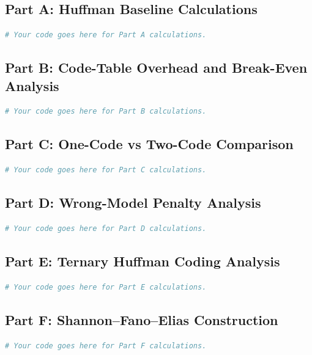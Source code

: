 \documentclass[11pt,a4paper]{article}
\begin{document}
\subsection{Part A: Huffman Baseline Calculations}
\begin{lstlisting}[language=Python]
# Your code goes here for Part A calculations.
\end{lstlisting}

\subsection{Part B: Code-Table Overhead and Break-Even Analysis}
\begin{lstlisting}[language=Python]
# Your code goes here for Part B calculations.
\end{lstlisting}

\subsection{Part C: One-Code vs Two-Code Comparison}
\begin{lstlisting}[language=Python]
# Your code goes here for Part C calculations.
\end{lstlisting}

\subsection{Part D: Wrong-Model Penalty Analysis}
\begin{lstlisting}[language=Python]
# Your code goes here for Part D calculations.
\end{lstlisting}

\subsection{Part E: Ternary Huffman Coding Analysis}
\begin{lstlisting}[language=Python]
# Your code goes here for Part E calculations.
\end{lstlisting}

\subsection{Part F: Shannon--Fano--Elias Construction}
\begin{lstlisting}[language=Python]
# Your code goes here for Part F calculations.
\end{lstlisting}
\end{document}
